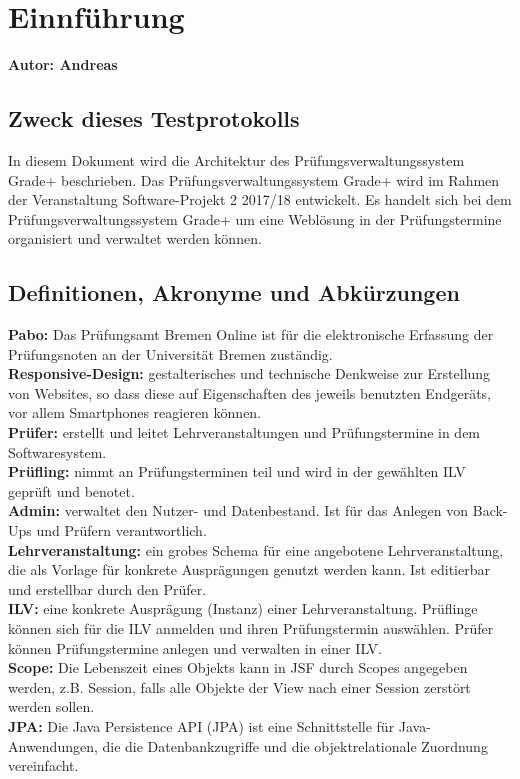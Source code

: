 
\section{Einnführung} \label{sec:einführung}

\textbf{Autor: Andreas}\\
\subsection{Zweck dieses Testprotokolls} %


{  In diesem Dokument wird die Architektur des Prüfungsverwaltungssystem \glqq{}Grade+\grqq{} 
beschrieben. Das Prüfungsverwaltungssystem \glqq{}Grade+\grqq{}  wird im Rahmen der Veranstaltung Software-Projekt 2 2017/18 entwickelt. Es handelt sich bei dem Prüfungsverwaltungssystem \glqq{}Grade+\grqq{}  um eine Weblösung in der Prüfungstermine organisiert und verwaltet werden können.  \\
}

%

\subsection{Definitionen, Akronyme und Abkürzungen}
{ 
\textbf{Pabo:}  Das Prüfungsamt Bremen Online ist für die elektronische Erfassung der Prüfungsnoten an der Universität Bremen zuständig.\\
\textbf{Responsive-Design:}  gestalterisches und technische Denkweise zur Erstellung von Websites, so dass diese auf Eigenschaften des jeweils benutzten Endgeräts, vor allem Smartphones reagieren können.\\
\textbf{Prüfer:} erstellt und leitet Lehrveranstaltungen und Prüfungstermine in dem Softwaresystem. \\ 
\textbf{Prüfling:} nimmt an Prüfungsterminen teil und wird in der gewählten ILV geprüft und benotet. \\ 
\textbf{Admin:} verwaltet den Nutzer- und Datenbestand. Ist für das Anlegen von Back-Ups und Prüfern verantwortlich. \\
\textbf{Lehrveranstaltung:} ein grobes Schema für eine angebotene Lehrveranstaltung, die als Vorlage für konkrete Ausprägungen genutzt werden kann. Ist editierbar und erstellbar durch den Prüfer. \\
\textbf{ILV:} eine konkrete Ausprägung (Instanz) einer Lehrveranstaltung. Prüflinge können sich für die ILV anmelden und ihren Prüfungstermin auswählen. Prüfer können Prüfungstermine anlegen und verwalten in einer ILV. \\
\textbf{Scope:} Die Lebenszeit eines Objekts kann in JSF durch Scopes angegeben werden, z.B. Session, falls alle Objekte der View nach einer Session zerstört werden sollen.\\
\textbf{JPA:} Die Java Persistence API (JPA) ist eine Schnittstelle für Java-Anwendungen, die die Datenbankzugriffe und die objektrelationale Zuordnung vereinfacht.
}

